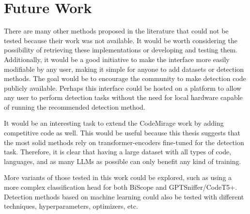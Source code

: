 \section{Future Work}
There are many other methods proposed in the literature 
that could not be tested because their work was not available. 
It would be worth considering the possibility of retrieving these 
implementations or developing and testing them. Additionally, it 
would be a good initiative to make the interface more easily 
modifiable by any user, making it simple for anyone to add datasets 
or detection methods. The goal would be to encourage the community 
to make detection code publicly available. Perhaps this interface 
could be hosted on a platform to allow any user to perform detection 
tasks without the need for local hardware capable of running the 
recommended detection method.

It would be an interesting task to extend the CodeMirage work by 
adding competitive code as well. This would be useful because this 
thesis suggests that the most solid methods rely on transformer-encoders 
fine-tuned for the detection task. Therefore, it is clear that having 
a large dataset with all types of code, languages, and as many LLMs as 
possible can only benefit any kind of training.

More variants of those tested in this work could be explored, 
such as using a more complex classification head for both BiScope 
and GPTSniffer/CodeT5+. Detection methods based on machine learning 
could also be tested with different techniques, hyperparameters, optimizers, etc.